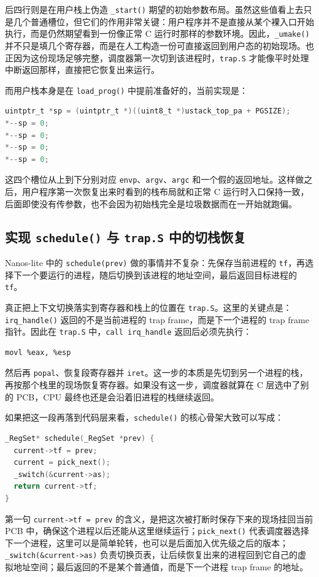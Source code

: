 \documentclass[a4paper]{article}
\begin{document}
后四行则是在用户栈上伪造 \texttt{\_start()} 期望的初始参数布局。虽然这些值看上去只是几个普通槽位，但它们的作用非常关键：用户程序并不是直接从某个裸入口开始执行，而是仍然期望看到一份像正常 C 运行时那样的参数环境。因此，\texttt{\_umake()} 并不只是填几个寄存器，而是在人工构造一份可直接返回到用户态的初始现场。也正因为这份现场足够完整，调度器第一次切到该进程时，\texttt{trap.S} 才能像平时处理中断返回那样，直接把它恢复出来运行。

而用户栈本身是在 \texttt{load\_prog()} 中提前准备好的，当前实现是：
\begin{lstlisting}[language=C]
uintptr_t *sp = (uintptr_t *)((uint8_t *)ustack_top_pa + PGSIZE);
*--sp = 0;
*--sp = 0;
*--sp = 0;
*--sp = 0;
\end{lstlisting}

这四个槽位从上到下分别对应 \texttt{envp}、\texttt{argv}、\texttt{argc} 和一个假的返回地址。这样做之后，用户程序第一次恢复出来时看到的栈布局就和正常 C 运行时入口保持一致，后面即使没有传参数，也不会因为初始栈完全是垃圾数据而在一开始就跑偏。

\subsection{实现 \texttt{schedule()} 与 \texttt{trap.S} 中的切栈恢复}
Nanos-lite 中的 \texttt{schedule(prev)} 做的事情并不复杂：先保存当前进程的 \texttt{tf}，再选择下一个要运行的进程，随后切换到该进程的地址空间，最后返回目标进程的 \texttt{tf}。

真正把上下文切换落实到寄存器和栈上的位置在 \texttt{trap.S}。这里的关键点是：\texttt{irq\_handle()} 返回的不是当前进程的 trap frame，而是下一个进程的 trap frame 指针。因此在 \texttt{trap.S} 中，\texttt{call irq\_handle} 返回后必须先执行：
\begin{lstlisting}[language={[x86masm]Assembler}]
movl %eax, %esp
\end{lstlisting}
然后再 \texttt{popal}、恢复段寄存器并 \texttt{iret}。这一步的本质是先切到另一个进程的栈，再按那个栈里的现场恢复寄存器。如果没有这一步，调度器就算在 C 层选中了别的 PCB，CPU 最终也还是会沿着旧进程的栈继续返回。

如果把这一段再落到代码层来看，\texttt{schedule()} 的核心骨架大致可以写成：
\begin{lstlisting}[language=C]
_RegSet* schedule(_RegSet *prev) {
  current->tf = prev;
  current = pick_next();
  _switch(&current->as);
  return current->tf;
}
\end{lstlisting}

第一句 \texttt{current->tf = prev} 的含义，是把这次被打断时保存下来的现场挂回当前 PCB 中，确保这个进程以后还能从这里继续运行；\texttt{pick\_next()} 代表调度器选择下一个进程，这里可以是简单轮转，也可以是后面加入优先级之后的版本；\texttt{\_switch(\&current->as)} 负责切换页表，让后续恢复出来的进程回到它自己的虚拟地址空间；最后返回的不是某个普通值，而是下一个进程 trap frame 的地址。
\end{document}
